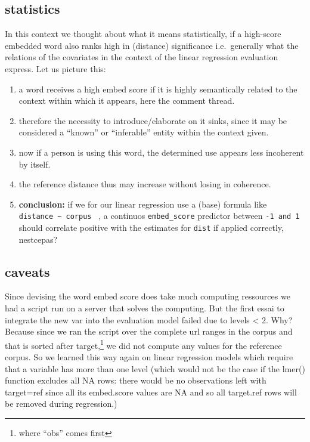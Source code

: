 \documentclass[
  12pt,
  oneside]{book}
\providecommand{\tightlist}{%
  \setlength{\itemsep}{0pt}\setlength{\parskip}{0pt}}
\begin{document}
\subsection{statistics}\label{statistics}

In this context we thought about what it means statistically, if a high-score embedded word also ranks high in (distance) significance i.e.~generally what the relations of the covariates in the context of the linear regression evaluation express. Let us picture this:

\begin{enumerate}
\def\labelenumi{\arabic{enumi}.}
\tightlist
\item
  a word receives a high embed score if it is highly semantically related to the context within which it appears, here the comment thread.
\item
  therefore the necessity to introduce/elaborate on it sinks, since it may be considered a ``known'' or ``inferable'' entity within the context given.
\item
  now if a person is using this word, the determined use appears less incoherent by itself.
\item
  the reference distance thus may increase without losing in coherence.
\item
  \textbf{conclusion:} if we for our linear regression use a (base) formula like \texttt{distance\ \textasciitilde{}\ corpus~} , a continuos \texttt{embed\_score} predictor between \texttt{-1\ and\ 1} should correlate positive with the estimates for \texttt{dist} if applied correctly, nestcepas?
\end{enumerate}

\subsection{caveats}\label{caveats}

Since devising the word embed score does take much computing ressources we had a script run on a server that solves the computing. But the first essai to integrate the new var into the evaluation model failed due to levels \textless{} 2. Why? Because since we ran the script over the complete url ranges in the corpus and that is sorted after target,\footnote{where ``obs'' comes first} we did not compute any values for the reference corpus. So we learned this way again on linear regression models which require that a variable has more than one level (which would not be the case if the lmer() function excludes all NA rows: there would be no observations left with target=ref since all its embed.score values are NA and so all target.ref rows will be removed during regression.)
\end{document}
